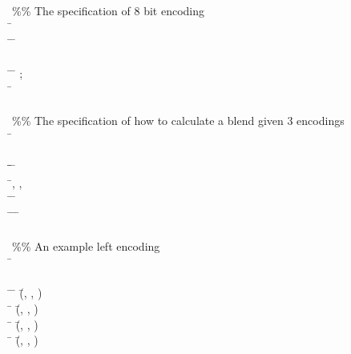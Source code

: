 \documentclass{AISB2008}
\begin{document}
\begin{listing}
{\scriptsize
\begin{hetcasl}
 \\
\\
 \\
\%\% The specification of 8 bit encoding\\
\SPEC \= \Ax{=}\\
\>   \= \Ax{:}\Ax{:}\=\Ax{=}  \AltBar{} \\
\> \SORT {}\\
\> \OPS \= \Ax{:} \= \Ax{\times}  \Ax{\times}  \Ax{\rightarrow} ;\\
\>\> \Ax{\_\_} \Ax{:} \= \Ax{\rightarrow} \\
\\
\%\% The specification of how to calculate a blend given 3 encodings\\
\SPEC \= \Ax{=}\\
\> \\
\THEN \=\OP \=\Ax{\_\_}\Ax{\_\_} \Ax{:} \= \Ax{\times}  \Ax{\rightarrow} \\
\> \Ax{\forall} \=, ,  \Ax{:}  \\
\> \Ax{\bullet} \=  \Ax{=}   \Ax{\Rightarrow} \=   \Ax{=}  \\
\> \Ax{\bullet} \=\Ax{\neg} \=  \Ax{=}   \Ax{\Rightarrow} \=   \Ax{=}  \\
\\
\%\% An example left encoding\\
\SPEC \= \Ax{=}\\
\> \\
\THEN \=\Ax{\bullet} \= (\=, , ) \Ax{=} \\
\> \Ax{\bullet} \= (\=, , ) \Ax{=} \\
\> \Ax{\bullet} \= (\=, , ) \Ax{=} \\
\> \Ax{\bullet} \= (\=, , ) \Ax{=} \\

\end{hetcasl}}
\end{listing}
\end{document}
